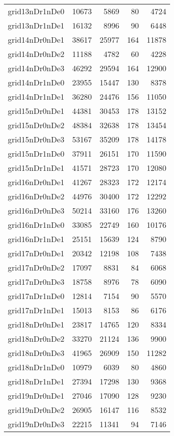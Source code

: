 \begin{longtable}{lrrrr}
grid13nDr1nDe0 & 10673 & 5869 & 80 & 4724 \\
grid13nDr1nDe1 & 16132 & 8996 & 90 & 6448 \\
grid14nDr0nDe1 & 38617 & 25977 & 164 & 11878 \\
grid14nDr0nDe2 & 11188 & 4782 & 60 & 4228 \\
grid14nDr0nDe3 & 46292 & 29594 & 164 & 12900 \\
grid14nDr1nDe0 & 23955 & 15447 & 130 & 8378 \\
grid14nDr1nDe1 & 36280 & 24476 & 156 & 11050 \\
grid15nDr0nDe1 & 44381 & 30453 & 178 & 13152 \\
grid15nDr0nDe2 & 48384 & 32638 & 178 & 13454 \\
grid15nDr0nDe3 & 53167 & 35209 & 178 & 14178 \\
grid15nDr1nDe0 & 37911 & 26151 & 170 & 11590 \\
grid15nDr1nDe1 & 41571 & 28723 & 170 & 12080 \\
grid16nDr0nDe1 & 41267 & 28323 & 172 & 12174 \\
grid16nDr0nDe2 & 44976 & 30400 & 172 & 12292 \\
grid16nDr0nDe3 & 50214 & 33160 & 176 & 13260 \\
grid16nDr1nDe0 & 33085 & 22749 & 160 & 10176 \\
grid16nDr1nDe1 & 25151 & 15639 & 124 & 8790 \\
grid17nDr0nDe1 & 20342 & 12198 & 108 & 7438 \\
grid17nDr0nDe2 & 17097 & 8831 & 84 & 6068 \\
grid17nDr0nDe3 & 18758 & 8976 & 78 & 6090 \\
grid17nDr1nDe0 & 12814 & 7154 & 90 & 5570 \\
grid17nDr1nDe1 & 15013 & 8153 & 86 & 6176 \\
grid18nDr0nDe1 & 23817 & 14765 & 120 & 8334 \\
grid18nDr0nDe2 & 33270 & 21124 & 136 & 9900 \\
grid18nDr0nDe3 & 41965 & 26909 & 150 & 11282 \\
grid18nDr1nDe0 & 10979 & 6039 & 80 & 4860 \\
grid18nDr1nDe1 & 27394 & 17298 & 130 & 9368 \\
grid19nDr0nDe1 & 27046 & 17090 & 128 & 9230 \\
grid19nDr0nDe2 & 26905 & 16147 & 116 & 8532 \\
grid19nDr0nDe3 & 22215 & 11341 & 94 & 7146 \\

\end{longtable}
